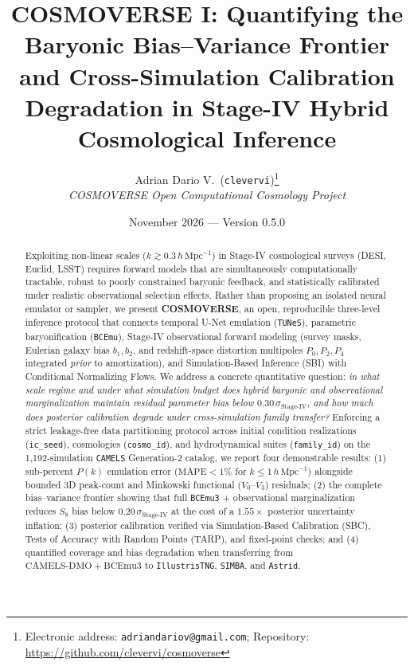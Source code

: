 \documentclass[twocolumn,10pt]{article}
\title{\textbf{COSMOVERSE I: Quantifying the Baryonic Bias--Variance Frontier and Cross-Simulation Calibration Degradation in Stage-IV Hybrid Cosmological Inference}}
\author{
  Adrian Dario V.\ (\texttt{clevervi})\thanks{Electronic address: \texttt{adriandariov@gmail.com}; Repository: \url{https://github.com/clevervi/cosmoverse}}\\
  \textit{COSMOVERSE Open Computational Cosmology Project}
}
\date{November 2026 --- Version 0.5.0}
\begin{document}
\maketitle

\begin{abstract}
Exploiting non-linear scales ($k \gtrsim 0.3\,h\,\mathrm{Mpc}^{-1}$) in Stage-IV cosmological surveys (DESI, Euclid, LSST) requires forward models that are simultaneously computationally tractable, robust to poorly constrained baryonic feedback, and statistically calibrated under realistic observational selection effects. Rather than proposing an isolated neural emulator or sampler, we present \textbf{COSMOVERSE}, an open, reproducible three-level inference protocol that connects temporal U-Net emulation (\texttt{TUNeS}), parametric baryonification (\texttt{BCEmu}), Stage-IV observational forward modeling (survey masks, Eulerian galaxy bias $b_1, b_2$, and redshift-space distortion multipoles $P_0, P_2, P_4$ integrated \emph{prior} to amortization), and Simulation-Based Inference (SBI) with Conditional Normalizing Flows. We address a concrete quantitative question: \emph{in what scale regime and under what simulation budget does hybrid baryonic and observational marginalization maintain residual parameter bias below $0.30\,\sigma_{\mathrm{Stage\text{-}IV}}$, and how much does posterior calibration degrade under cross-simulation family transfer?} Enforcing a strict leakage-free data partitioning protocol across initial condition realizations (\texttt{ic\_seed}), cosmologies (\texttt{cosmo\_id}), and hydrodynamical suites (\texttt{family\_id}) on the 1,192-simulation \texttt{CAMELS} Generation-2 catalog, we report four demonstrable results: (1) sub-percent $P(k)$ emulation error ($\mathrm{MAPE} < 1\%$ for $k \le 1\,h\,\mathrm{Mpc}^{-1}$) alongside bounded 3D peak-count and Minkowski functional ($V_0$--$V_3$) residuals; (2) the complete bias--variance frontier showing that full \texttt{BCEmu3} + observational marginalization reduces $S_8$ bias below $0.20\,\sigma_{\mathrm{Stage\text{-}IV}}$ at the cost of a $1.55\times$ posterior uncertainty inflation; (3) posterior calibration verified via Simulation-Based Calibration (SBC), Tests of Accuracy with Random Points (TARP), and fixed-point checks; and (4) quantified coverage and bias degradation when transferring from $\mathrm{CAMELS\text{-}DMO} + \mathrm{BCEmu3}$ to \texttt{IllustrisTNG}, \texttt{SIMBA}, and \texttt{Astrid}.
\end{abstract}
\end{document}
